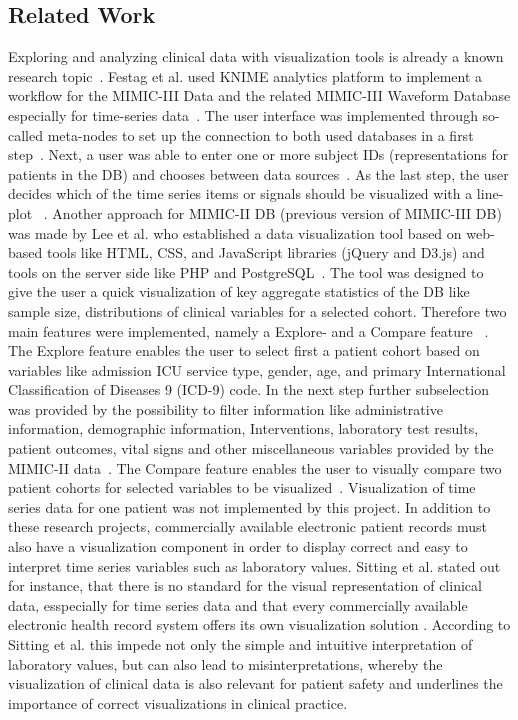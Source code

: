 \documentclass[aac,crcready]{iosart2x}
\begin{document}
\subsection{Related Work}
Exploring and analyzing clinical data with visualization tools is already a known research topic~\cite{Caban.2015, Sittig.2015, UnberathPhilipp.2019, Festag.2019}. Festag et al. used KNIME analytics platform to implement a workflow for the MIMIC-III Data and the related MIMIC-III Waveform Database especially for time-series data~\cite{Festag.2019}. The user interface was implemented through so-called meta-nodes to set up the connection to both used databases in a first step~\cite{Festag.2019}. Next, a user was able to enter one or more subject IDs (representations for patients in the DB) and chooses between data sources~\cite{Festag.2019}. As the last step, the user decides which of the time series items or signals should be visualized with a line-plot ~\cite{Festag.2019}.
Another approach for MIMIC-II DB (previous version of MIMIC-III DB) was made by Lee et al. who established a data visualization tool based on web-based tools like HTML, CSS, and JavaScript libraries (jQuery and D3.js) and tools on the server side like PHP and PostgreSQL~\cite{Lee.2016}. The tool was designed to give the user a quick visualization of key aggregate statistics of the DB like sample size, distributions of clinical variables for a selected cohort. Therefore two main features were implemented, namely a Explore- and a Compare feature ~\cite{Lee.2016}. The Explore feature enables the user to select first a patient cohort based on variables like admission ICU service type, gender, age, and primary International Classification of Diseases 9 (ICD-9) code. In the next step further subselection was provided by the possibility to filter information like administrative information, demographic information, Interventions, laboratory test results, patient outcomes, vital signs and other miscellaneous variables provided by the MIMIC-II data~\cite{Lee.2016}. The Compare feature enables the user to visually compare two patient cohorts for
selected variables to be visualized~\cite{Lee.2016}. Visualization of time series data for one patient was not implemented by this project. In addition to these research projects, commercially available electronic patient records must also have a visualization component in order to display correct and easy to interpret time series variables such as laboratory values. Sitting et al. stated out for instance, that there is no standard for the visual representation of clinical data, esspecially for time series data and that every commercially available electronic health record system offers its own visualization solution \cite{Sittig.2015}. According to Sitting et al. this impede not only the simple and intuitive interpretation of laboratory values, but can also lead to misinterpretations, whereby the visualization of clinical data is also relevant for patient safety and underlines the importance of correct visualizations in clinical practice.
\end{document}
